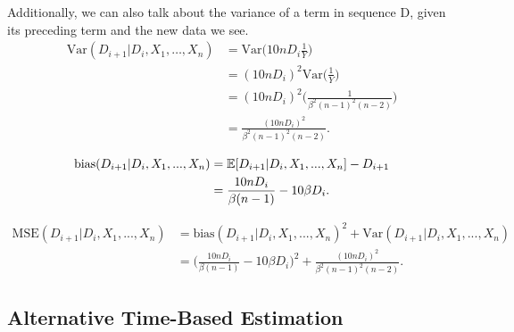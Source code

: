 Additionally, we can also talk about the variance of a term in sequence D, given its preceding term and the new data we see. 
\begin{align}
\text{Var}(D_{i+1} | D_{i}, X_1, \dots, X_{n}) &= \text{Var}\bigg(10n D_i \frac{1}{Y}\bigg) \\
&= (10n D_i)^2 \text{Var}\bigg(\frac{1}{Y}\bigg) \\
&= (10n D_i)^2 \Bigg(\frac{1}{\beta^2(n-1)^2(n-2)}\Bigg) \\
&= \frac{(10n D_i)^2}{\beta^2(n-1)^2(n-2)}.
\end{align}

\begin{align}
\text{bias}(D_{i+1}|D_i,X_1,...,X_n) &= \operatorname{\mathbb{E}}[D_{i+1}|D_i,X_1,...,X_n] - D_{i+1} \\
&= \frac{10n D_i}{\beta(n-1)} - 10\beta D_i.
\end{align}

\begin{align}
\text{MSE}(D_{i+1}|D_i,X_1,...,X_n) &= \text{bias}(D_{i+1}|D_i,X_1,...,X_n)^2 + \text{Var}(D_{i+1}|D_i,X_1,...,X_n) \\
&= \Bigg(\frac{10n D_i}{\beta(n-1)} - 10\beta D_i\Bigg)^2 + \frac{(10n D_i)^2}{\beta^2(n-1)^2(n-2)}.
\end{align}

\subsection{Alternative Time-Based Estimation}\label{sec:time-based}

